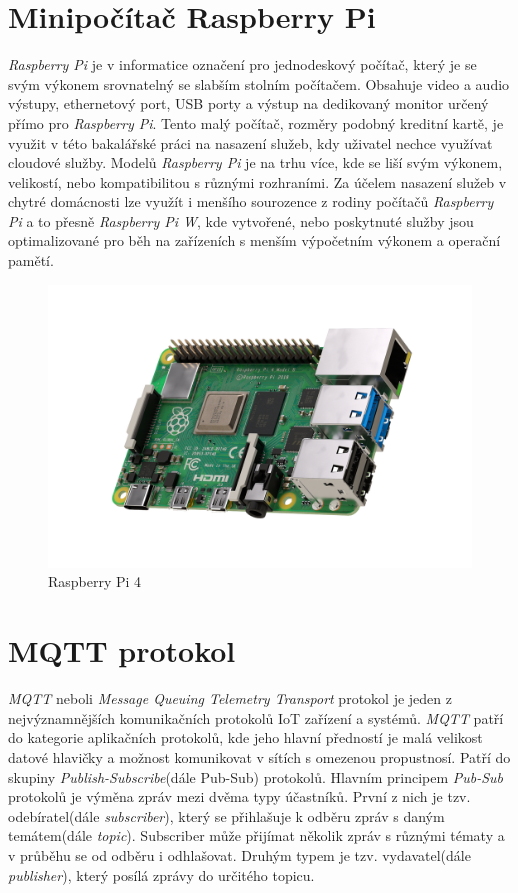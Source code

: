 \section{Minipočítač Raspberry Pi}
\label{terminy:raspberry}

\emph{Raspberry Pi} je v informatice označení pro jednodeskový počítač, který je se svým výkonem srovnatelný se slabším stolním počítačem. Obsahuje video a audio výstupy,
ethernetový port, USB porty a výstup na dedikovaný monitor určený přímo pro \emph{Raspberry Pi}. Tento malý počítač, rozměry podobný kreditní kartě, je využit v této bakalářské práci na nasazení služeb, kdy uživatel nechce využívat cloudové služby.
Modelů \emph{Raspberry Pi} je na trhu více, kde se liší svým výkonem, velikostí, nebo kompatibilitou s různými rozhraními. Za účelem nasazení služeb v chytré domácnosti lze využít i menšího sourozence z rodiny počítačů \emph{Raspberry Pi} a to přesně \emph{Raspberry Pi W},
kde vytvořené, nebo poskytnuté služby jsou optimalizované pro běh na zařízeních s menším výpočetním výkonem a operační pamětí.

\begin{figure}[ht]
  \centering
  \includegraphics[width=.5 \linewidth]{obrazky-figures/raspberry.png}
  \caption{Raspberry Pi 4}
\end{figure}

\newpage

\section{MQTT protokol}
\label{terminy:mqtt}

\emph{MQTT} neboli \emph{Message Queuing Telemetry Transport} protokol je jeden z nejvýznamnějších komunikačních protokolů IoT zařízení a systémů.
\emph{MQTT} patří do kategorie aplikačních protokolů, kde jeho hlavní předností je malá velikost datové hlavičky a možnost komunikovat v sítích s omezenou propustnosí.
Patří do skupiny \emph{Publish-Subscribe}(dále Pub-Sub) protokolů. Hlavním principem \emph{Pub-Sub} protokolů je výměna zpráv mezi dvěma typy účastníků. První z nich je tzv. odebíratel(dále \emph{subscriber}),
který se přihlašuje k odběru zpráv s daným temátem(dále \emph{topic}).
Subscriber může přijímat několik zpráv s různými tématy a v průběhu se od odběru i odhlašovat. Druhým typem je tzv. vydavatel(dále \emph{publisher}), který posílá zprávy do určitého
topicu.~\cite{mqtt:info}

